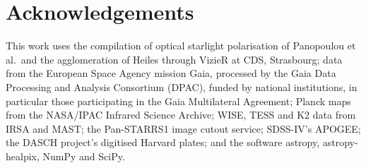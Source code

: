 \documentclass[3p,11pt]{elsarticle}
\begin{document}
\section*{Acknowledgements}

This work uses the compilation of optical starlight polarisation of Panopoulou et al.\
and the agglomeration of Heiles through VizieR at CDS, Strasbourg; data from the
European Space Agency mission Gaia, processed by the Gaia Data Processing and Analysis
Consortium (DPAC), funded by national institutions, in particular those participating
in the Gaia Multilateral Agreement; Planck maps from the NASA/IPAC Infrared Science
Archive; WISE, TESS and K2 data from IRSA and MAST; the Pan-STARRS1 image cutout service;
SDSS-IV's APOGEE; the DASCH project's digitised Harvard plates; and the software astropy,
astropy-healpix, NumPy and SciPy.
\end{document}
